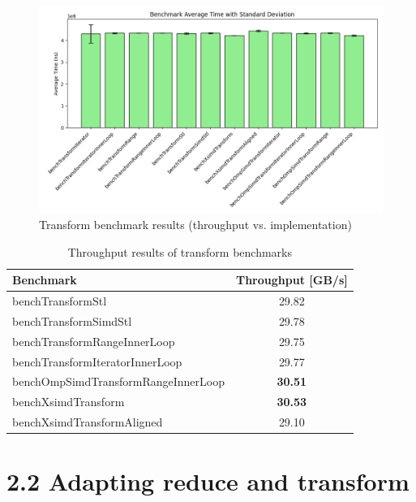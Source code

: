 \pagebreak

\begin{figure}[h!]
    \centering
    \includegraphics[width=0.9\linewidth]{img/simd_transform_output.txt_ex02.png}
    \caption{Transform benchmark results (throughput vs. implementation)}
    \label{fig:simd_transform_output}
\end{figure}

\begin{table}[h!]
    \centering
    \begin{tabular}{|l|c|}
        \hline
        \textbf{Benchmark}                  & \textbf{Throughput [GB/s]} \\
        \hline
        benchTransformStl                   & 29.82                      \\
        benchTransformSimdStl               & 29.78                      \\
        benchTransformRangeInnerLoop        & 29.75                      \\
        benchTransformIteratorInnerLoop     & 29.77                      \\
        benchOmpSimdTransformRangeInnerLoop & \textbf{30.51}             \\
        benchXsimdTransform                 & \textbf{30.53}             \\
        benchXsimdTransformAligned          & 29.10                      \\
        \hline
    \end{tabular}
    \caption{Throughput results of transform benchmarks}
    \label{tab:simd_transform_output}
\end{table}

\pagebreak

\section*{2.2 Adapting reduce and transform}

